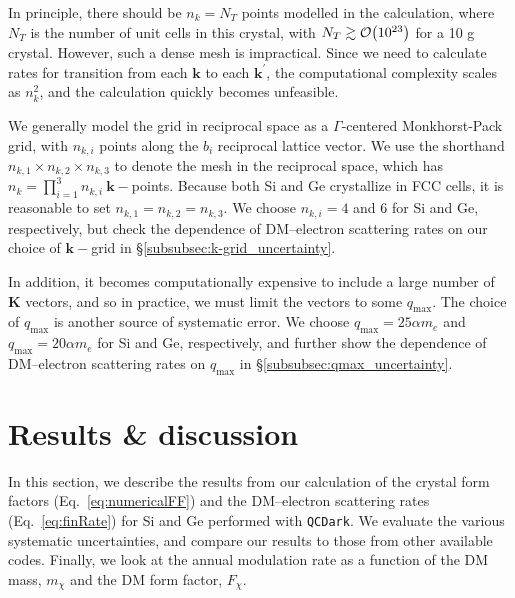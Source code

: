 \documentclass[
    prd, twocolumn, superscriptaddress, nofootinbib, amsmath, amssymb,
    aps, floatfix,preprintnumbers
]{revtex4-2}
\begin{document}
        In principle, there should be $n_k = N_T$ points modelled in the calculation, where $N_T$ is the number of unit cells in this crystal, with $N_T \gtrsim \order{10^{23}}$ for a 10 g crystal. However, such a dense mesh is impractical. Since we need to calculate rates for transition from each $\mathbf{k}$ to each $\mathbf{k}^\prime$, the computational complexity scales as $n_k^2$, and the calculation quickly becomes unfeasible.
        
        We generally model the grid in reciprocal space as a $\Gamma$-centered Monkhorst-Pack grid, with $n_{k,i}$ points along the $b_i$ reciprocal lattice vector. We use the shorthand $n_{k,1}\times n_{k,2}\times n_{k,3}$ to denote the mesh in the reciprocal space, which has $n_k = \prod_{i = 1}^3 n_{k,i}\ \mathbf{k}-$points. Because both Si and Ge crystallize in FCC cells, it is reasonable to set $n_{k,1} = n_{k,2} = n_{k,3}$. We choose $n_{k,i} = 4$ and $6$ for Si and Ge, respectively, but check the dependence of DM--electron scattering rates on our choice of $\mathbf{k}-$grid in \S\ref{subsubsec:k-grid_uncertainty}. 
        
        In addition, it becomes computationally expensive to include a large number of $\mathbf{K}$ vectors, and so in practice, we must limit the vectors to some $q_\mathrm{max}$. The choice of $q_\mathrm{max}$ is another source of systematic error. We choose $q_\mathrm{max} = 25 \alpha m_e$ and $q_\mathrm{max} = 20 \alpha m_e$ for Si and Ge, respectively, and further show the dependence of DM--electron scattering rates on $q_\mathrm{max}$ in \S\ref{subsubsec:qmax_uncertainty}. 
    
\section{Results \& discussion}\label{sec:4}

    In this section, we describe the results from our calculation of the crystal form factors (Eq.~\eqref{eq:numericalFF}) and the DM--electron scattering rates (Eq.~\eqref{eq:finRate}) for Si and Ge performed with \texttt{QCDark}. We evaluate the various systematic uncertainties, and compare our results to those from other available codes. Finally, we look at the annual modulation rate as a function of the DM mass, $m_\chi$ and the DM form factor, $F_\chi$.
\end{document}
